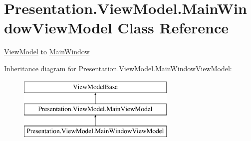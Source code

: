 \hypertarget{class_presentation_1_1_view_model_1_1_main_window_view_model}{}\section{Presentation.\+View\+Model.\+Main\+Window\+View\+Model Class Reference}
\label{class_presentation_1_1_view_model_1_1_main_window_view_model}


\hyperlink{namespace_presentation_1_1_view_model}{View\+Model} to \hyperlink{class_presentation_1_1_main_window}{Main\+Window}  


Inheritance diagram for Presentation.\+View\+Model.\+Main\+Window\+View\+Model\+:\begin{figure}[H]
\begin{center}
\leavevmode
\includegraphics[height=3.000000cm]{class_presentation_1_1_view_model_1_1_main_window_view_model}
\end{center}
\end{figure}
